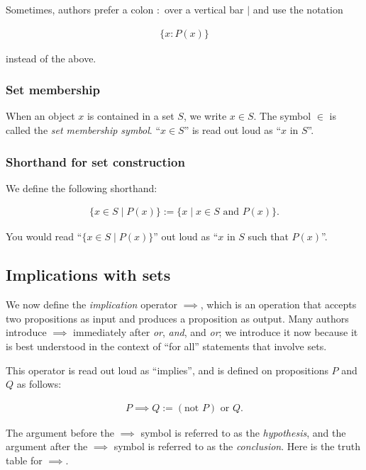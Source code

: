 Sometimes, authors prefer a colon $:$ over a vertical bar $|$ and use the notation 

\begin{align*}
    \{ x : P(x) \}
\end{align*}

instead of the above.

\subsubsection*{Set membership}

When an object $x$ is contained in a set $S$, we write $x \in S$. The symbol $\in$ is called the \textit{set membership symbol}. ``$x \in S$'' is read out loud as ``$x$ in $S$''.

\subsubsection*{Shorthand for set construction}

We define the following shorthand:

\begin{align*}
    \{ x \in S \mid P(x)\} := \{ x \mid x \in S \text{ and } P(x)\}.
\end{align*}

You would read ``$\{ x \in S \mid P(x)\}$'' out loud as ``$x$ in $S$ such that $P(x)$''.

\newpage

\subsection*{Implications with sets}

We now define the \textit{implication} operator $\implies$, which is an operation that accepts two propositions as input and produces a proposition as output. Many authors introduce $\implies$ immediately after \textit{or}, \textit{and}, and \textit{or}; we introduce it now because it is best understood in the context of ``for all'' statements that involve sets.

This operator is read out loud as ``implies'', and is defined on propositions $P$ and $Q$ as follows:

\begin{align*}
    P \implies Q := (\text{not } P) \text{ or } Q.
\end{align*}

The argument before the $\implies$ symbol is referred to as the \textit{hypothesis}, and the argument after the $\implies$ symbol is referred to as the \textit{conclusion}. Here is the truth table for $\implies$.

